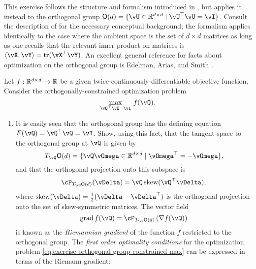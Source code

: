 \documentclass[../../book-main.tex]{subfiles}
\begin{document}
\begin{exercise}\label{exercise:orthogonal-group-calculus}
    This exercise follows the structure and formalism introduced in , but applies it instead to the orthogonal group $\O(d) = \set{\vU \in \R^{d \times d} \given \vU^\top \vU = \vI}$. 
    Consult the description of  for the necessary conceptual background; the formalism applies identically to the case where the ambient space is the set of $d \times d$ matrices as long as one recalls that the relevant inner product on matrices is $\ip{\vX}{\vY} = \tr(\vX^\top \vY)$.
    An excellent general reference for facts about optimization on the orthogonal group is Edelman, Arias, and Smith \cite{Edelman1998-lg}.
    
    Let $f : \mathbb{R}^{d\times d} \to \mathbb{R}$ be a given twice-continuously-differentiable objective function. Consider the orthogonally-constrained optimization problem
    \begin{equation}\label{eq:exercise-orthogonal-group-constrained-max}
        \max_{\vQ^\top \vQ = \vI}\, f(\vQ). 
    \end{equation}
    \begin{enumerate}
        \item  It is easily seen that the orthogonal group has the defining equation $F(\vQ) = \vQ^\top \vQ = \vI$.
        Show, using this fact, that the tangent space to the orthogonal group at $\vQ$ is given by
        \begin{equation*}
            T_{\vQ} \O(d) = \set{\vQ \vOmega \in \R^{d\times d} \given \vOmega^\top = - \vOmega},
        \end{equation*}
        and that the orthogonal projection onto this subspace is 
        \begin{equation*}
        \cP_{T_{\vQ}\O(d)}(\vDelta) =  \vQ \Skew(\vQ^\top \vDelta),
        \end{equation*}
        where $\Skew(\vDelta) = \tfrac{1}{2} ( \vDelta - \vDelta^\top)$ is the orthogonal projection onto the set of skew-symmetric matrices.
        The vector field 
        \begin{equation}\label{eq:exercise-riemann-grad-orthogonal-group}
        \mathrm{grad}\, f(\vQ) = \cP_{T_{\vQ} \O(d)} \left( \nabla f(\vQ) \right)
        \end{equation}
        is known as the \textit{Riemannian gradient} of the function $f$ restricted to the orthogonal group.
        The \textit{first order optimality conditions} for the optimization problem \eqref{eq:exercise-orthogonal-group-constrained-max} can be expressed in terms of the Riemann gradient:

\end{enumerate}
\end{exercise}
\end{document}

